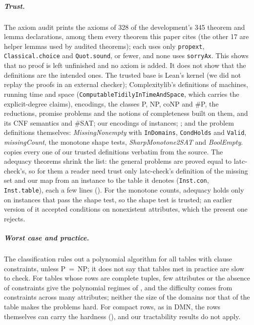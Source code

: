 \documentclass[pdflatex,sn-mathphys-num]{sn-jnl}
\theoremstyle{thmstyleone}
\theoremstyle{thmstylethree}
\begin{document}
\subparagraph*{Trust.}
The axiom audit prints the axioms of 328 of the development's 345 theorem and lemma
declarations, among them every theorem this paper cites (the other 17 are helper lemmas used by
audited theorems); each uses only \lstinline{propext}, \lstinline{Classical.choice} and
\lstinline{Quot.sound}, or fewer, and none uses \lstinline{sorryAx}. This shows that no proof is
left unfinished and no axiom is added. It does not show that the definitions are the intended
ones. The trusted base is Lean's kernel (we did not replay the proofs in an external checker);
Complexitylib's definitions of machines, running time and space
(\lstinline{ComputableTidilyInTimeAndSpace}, which carries the explicit-degree claims),
encodings, the classes P, NP, coNP and \#P, the reductions, promise problems and the notions of
completeness built on them, and its CNF semantics and \#SAT; our encodings of instances;
; and the problem definitions themselves: \textit{MissingNonempty} with
\lstinline{InDomains}, \lstinline{CondHolds} and \lstinline{Valid}, \textit{missingCount}, the
monotone shape tests, \textit{SharpMonotone2SAT} and \textit{BoolEmpty}. 
copies every one of our trusted definitions verbatim from the source. The adequacy theorems
shrink the list: the general problems are proved equal to latc-check's, so for them a reader need
trust only latc-check's definition of the missing set and our map from an instance to the table
it denotes (\lstinline{Inst.con}, \lstinline{Inst.table}), each a few lines
(). For the monotone counts, adequacy holds only on instances that
pass the shape test, so the shape test is trusted; an earlier version of it accepted conditions on
nonexistent attributes, which the present one rejects.

\subparagraph*{Worst case and practice.}
The classification rules out a polynomial algorithm for all tables with clause constraints,
unless P~=~NP; it does not say that tables met in practice are slow to check. For tables whose
rows are complete tuples, few attributes or the absence of constraints give the polynomial
regimes of , and the difficulty comes from constraints across many
attributes; neither the size of the domains nor that of the table makes the problems hard. For
compact rows, as in DMN, the rows themselves can carry the hardness (), and
our tractability results do not apply.

\end{document}
